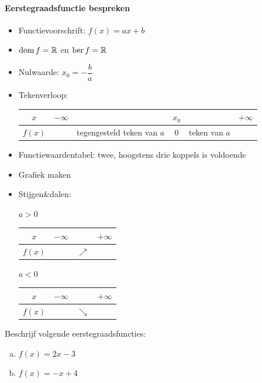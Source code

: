 \documentclass[12pt]{article}
\begin{document}
\paragraph*{Eerstegraadsfunctie bespreken}
\begin{mdframed}
  \begin{itemize}
  \item Functievoorschrift: $f(x)=ax + b$
  \item $\dom f = \mathbb{R}$ en $\ber f = \mathbb{R}$
  \item Nulwaarde: $x_0=-\dfrac{b}{a}$
  \item Tekenverloop:
    \begin{center}
      \begin{tabular}{c|lp{2.5cm}cp{1.5cm}r}
        $x$ & $-\infty$ & & $x_0$ & & $+\infty$\\
        \hline
        $f(x)$ & & tegengesteld teken van $a$ & 0 & teken van $a$ &
      \end{tabular}
    \end{center}
  \item Functiewaardentabel: twee, hoogstens drie koppels is voldoende
  \item Grafiek maken
  \item Stijgen\&dalen:\\
    \begin{minipage}{0.45\textwidth}
      \centering $a>0$\\
      \begin{tabular}{c|lcr}
        $x$ & $-\infty$ & & $+\infty$\\
        \hline
        $f(x)$ & & $\nearrow$ &
      \end{tabular}
    \end{minipage}
    \begin{minipage}{0.45\textwidth}
      \centering $a<0$\\
      \begin{tabular}{c|lcr}
        $x$ & $-\infty$ & & $+\infty$\\
        \hline
        $f(x)$ & & $\searrow$ &
      \end{tabular}
    \end{minipage}
  \end{itemize}
\end{mdframed}



\begin{oefening}
  Beschrijf volgende eerstegraadsfuncties:
  \begin{enumerate}[(a)]
  \item $f(x)=2x-3$
  \item $f(x)=-x+4$
  \end{enumerate}
\end{oefening}
\end{document}
